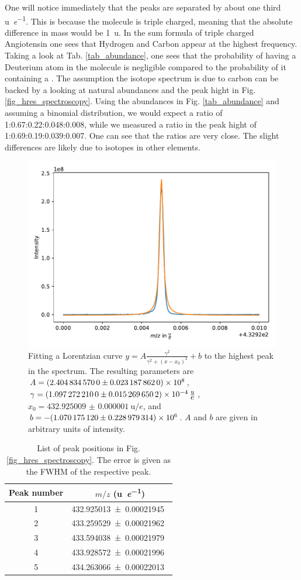 \documentclass[a4paper,10pt]{article}
\begin{document}
One will notice immediately that the peaks are separated by about one third \si{\atomicmassunit \per \elementarycharge}. This is because the molecule is triple charged, meaning that the absolute difference in mass would be \SI{1}{\atomicmassunit}. In the sum formula of triple charged Angiotensin  one sees that Hydrogen and Carbon appear at the highest frequency. Taking a look at Tab. \ref{tab_abundance}, one sees that the probability of having a Deuterium atom in the molecule is negligible compared to the probability of it containing a . The assumption the isotope spectrum is due to carbon can be backed by a looking at natural abundances and the peak hight in Fig. \ref{fig_hres_spectroscopy}. Using the abundances in Fig. \ref{tab_abundance} and assuming a binomial distribution, we would expect a ratio of 1:0.67:0.22:0.048:0.008, while we measured a ratio in the peak hight of 1:0.69:0.19:0.039:0.007. One can see that the ratios are very close. The slight differences are likely due to isotopes in other elements. 

\begin{figure}[htp!]
	\centering
	\includegraphics[width = 0.6 \textwidth]{fit_hires.pdf}
	\caption{Fitting a Lorentzian curve $y = A \frac{\gamma^2}{\gamma^2 + (x - x_0)^2} + b$ to the highest peak in the spectrum. The resulting parameters are $A = \num{2.40483457 \pm 0.0231878620 e8}$, $\gamma = \SI{1.09727221 \pm 0.0152696502 e-04}{\atomicmassunit \per \elementarycharge}$, $x_0 = \SI{432.925009(1)}{\atomicmassunit \per \elementarycharge}$, and $b = -\SI{1.07017512 \pm 0.228979314 e06}{}$. $A$ and $b$ are given in arbitrary units of intensity. }
	\label{fig_fit_hires}
\end{figure}

\begin{table}[htp!]
	\centering
	\caption{List of peak positions in Fig. \ref{fig_hres_spectroscopy}. The error is given as the FWHM of the respective peak.}
	\begin{tabular}{c | c }
		Peak number & $m/z$ (\si{\atomicmassunit \per \elementarycharge})\\ \hline
		1 & \SI{432.925013 \pm 0.00021945}{ }\\
		2 & \SI{433.259529 \pm 0.00021962}{ }\\
		3 & \SI{433.594038 \pm 0.00021979}{ }\\
		4 & \SI{433.928572 \pm 0.00021996}{ }\\ 		
		5 & \SI{434.263066 \pm 0.00022013}{ }\\
	\end{tabular}
	\label{tab_peaks_spectrum}
\end{table}
\end{document}
